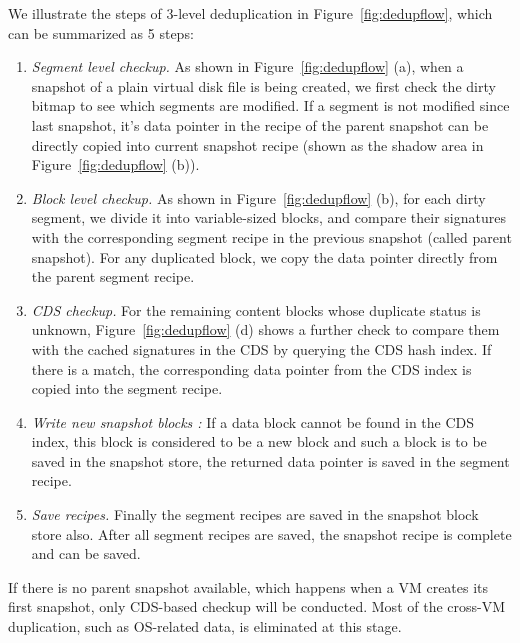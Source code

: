 We illustrate the steps of 3-level deduplication in Figure~\ref{fig:dedupflow}, which can be summarized as 5 steps:
\begin{enumerate}
\item {\em Segment level checkup.}
As shown in Figure~\ref{fig:dedupflow} (a),
when  a snapshot of a plain virtual disk file is being created, we first check the dirty bitmap 
to see which segments are modified. If a segment is not modified since last snapshot, 
it's data pointer in the recipe of the  parent snapshot  can be directly copied into 
current snapshot recipe (shown as the shadow area in Figure~\ref{fig:dedupflow} (b)).

\item {\em Block level checkup.}
As shown in Figure~\ref{fig:dedupflow} (b),
for each dirty segment, we divide it into variable-sized blocks,
and compare their signatures with  the corresponding segment recipe in the previous snapshot (called parent
snapshot). 
For any duplicated block, we copy the data pointer directly from the parent segment recipe. 
\item {\em CDS checkup.} For the remaining  content blocks whose duplicate status is unknown,
Figure~\ref{fig:dedupflow} (d)
shows  a further check to compare  them with  the cached signatures in the CDS by querying
the CDS hash index. If there is a match, the corresponding data pointer from the CDS index is
copied into the segment recipe. 
\item {\em Write new snapshot blocks :}
If a data block cannot be found in the CDS index, this block is considered to be a new block
and such a block is to be saved in the snapshot store, the returned data pointer is
saved in the  segment recipe.
\item {\em Save recipes.} Finally the  segment recipes are saved in the  snapshot block store also.
 After all segment recipes are saved, the snapshot recipe is complete and can be saved.
\end{enumerate}

If there is no parent snapshot available, which happens when a VM creates its first snapshot, 
only CDS-based checkup will be conducted. 
Most of the cross-VM duplication, such as OS-related data, is eliminated
at this stage. 
